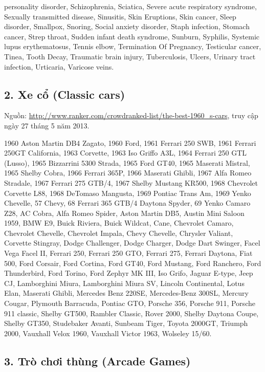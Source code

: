 personality disorder, Schizophrenia, Sciatica, Severe acute respiratory syndrome, Sexually transmitted disease, Sinusitis, Skin Eruptions, Skin cancer, Sleep disorder, Smallpox, Snoring, Social anxiety disorder, Staph infection, Stomach cancer, Strep throat, Sudden infant death syndrome, Sunburn, Syphilis, Systemic lupus erythematosus, Tennis elbow, Termination Of Pregnancy, Testicular cancer, Tinea, Tooth Decay, Traumatic brain injury, Tuberculosis, Ulcers, Urinary tract infection, Urticaria, Varicose veins.
\normalsize

\subsection*{2. Xe cổ (Classic cars)}

\noindent Nguồn: \url{http://www.ranker.com/crowdranked-list/the-best-1960_s-cars}, truy cập ngày 27 tháng 5 năm 2013.

\smallskip
\noindent\small 1960 Aston Martin DB4 Zagato, 1960 Ford, 1961 Ferrari 250 SWB, 1961 Ferrari 250GT California, 1963 Corvette, 1963 Iso Griffo A3L, 1964 Ferrari 250 GTL (Lusso), 1965 Bizzarrini 5300 Strada, 1965 Ford GT40, 1965 Maserati Mistral, 1965 Shelby Cobra, 1966 Ferrari 365P, 1966 Maserati Ghibli, 1967 Alfa Romeo Stradale, 1967 Ferrari 275 GTB/4, 1967 Shelby Mustang KR500, 1968 Chevrolet Corvette L88, 1968 DeTomaso Mangusta, 1969 Pontiac Trans Am, 1969 Yenko Chevelle, 57 Chevy, 68 Ferrari 365 GTB/4 Daytona Spyder, 69 Yenko Camaro Z28, AC Cobra, Alfa Romeo Spider, Aston Martin DB5, Austin Mini Saloon 1959, BMW E9, Buick Riviera, Buick Wildcat, Cane, Chevrolet Camaro, Chevrolet Chevelle, Chevrolet Impala, Chevy Chevelle, Chrysler Valiant, Corvette Stingray, Dodge Challenger, Dodge Charger, Dodge Dart Swinger, Facel Vega Facel II, Ferrari 250, Ferrari 250 GTO, Ferrari 275, Ferrari Daytona, Fiat 500, Ford Corsair, Ford Cortina, Ford GT40, Ford Mustang, Ford Ranchero, Ford Thunderbird, Ford Torino, Ford Zephyr MK III, Iso Grifo, Jaguar E-type, Jeep CJ, Lamborghini Miura, Lamborghini Miura SV, Lincoln Continental, Lotus Elan, Maserati Ghibli, Mercedes Benz 220SE, Mercedes-Benz 300SL, Mercury Cougar, Plymouth Barracuda, Pontiac GTO, Porsche 356, Porsche 911, Porsche 911 classic, Shelby GT500, Rambler Classic, Rover 2000, Shelby Daytona Coupe, Shelby GT350, Studebaker Avanti, Sunbeam Tiger, Toyota 2000GT, Triumph 2000, Vauxhall Velox 1960, Vauxhall Victor 1963, Wolseley 15/60.
\normalsize

\subsection*{3. Trò chơi thùng (Arcade Games)}

